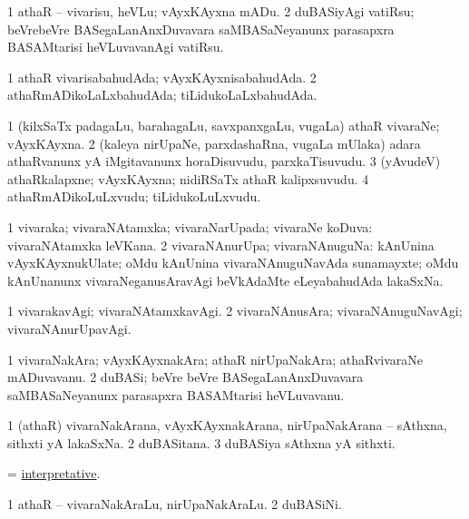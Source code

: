 \noindent 
\gl{\akirx}
\bmng
\bnum
\num{1} athaR -- vivarisu, heVLu; vAyxKAyxna mADu. 
\num{2} duBASiyAgi vatiRsu; beVrebeVre BASegaLanAnxDuvavara saMBASaNeyanunx parasapxra BASAMtarisi heVLuvavanAgi vatiRsu. 
\enum
\emng
\eentry

\bentry
{}
\gl{\gu}
\bmng
\bnum
\num{1} athaR vivarisabahudAda; vAyxKAyxnisabahudAda. 
\num{2} athaRmADikoLaLxbahudAda; tiLidukoLaLxbahudAda. 
\enum
\emng
\eentry

\bentry
{}
\gl{\nA}
\bmng
\bnum
\num{1} (kilxSaTx padagaLu, barahagaLu, savxpanxgaLu, \mo vugaLa) athaR vivaraNe; vAyxKAyxna. 
\num{2} (kaleya nirUpaNe, parxdashaRna, \mo vugaLa mUlaka) adara athaRvanunx yA iMgitavanunx horaDisuvudu, parxkaTisuvudu. 
\num{3} (yAvudeV) athaRkalapxne; vAyxKAyxna; nidiRSaTx athaR kalipxsuvudu. 
\num{4} athaRmADikoLuLxvudu; tiLidukoLuLxvudu. 
\enum
\emng
\eentry

\bentry
{}
\gl{\gu}
\bmng
\bnum
\num{1} vivaraka; vivaraNAtamxka; vivaraNarUpada; vivaraNe koDuva:  vivaraNAtamxka leVKana. 
\num{2} vivaraNAnurUpa; vivaraNAnuguNa:  kAnUnina vAyxKAyxnukUlate; oMdu kAnUnina vivaraNAnuguNavAda sunamayxte; oMdu kAnUnanunx vivaraNeganusAravAgi beVkAdaMte eLeyabahudAda lakaSxNa. 
\enum
\emng
\eentry

\bentry
{}
\gl{\kirxvi}
\bmng
\bnum
\num{1} vivarakavAgi; vivaraNAtamxkavAgi. 
\num{2} vivaraNAnusAra; vivaraNAnuguNavAgi; vivaraNAnurUpavAgi. 
\enum
\emng
\eentry

\bentry
{}
\gl{\nA}
\bmng
\bnum
\num{1} vivaraNakAra; vAyxKAyxnakAra; athaR nirUpaNakAra; athaRvivaraNe mADuvavanu. 
\num{2} duBASi; beVre beVre BASegaLanAnxDuvavara saMBASaNeyanunx parasapxra BASAMtarisi heVLuvavanu. 
\enum
\emng
\eentry

\bentry
{}
\gl{\nA}
\bmng
\bnum
\num{1} (athaR) vivaraNakArana, vAyxKAyxnakArana, nirUpaNakArana -- sAthxna, sithxti yA lakaSxNa. 
\num{2} duBASitana. 
\num{3} duBASiya sAthxna yA sithxti. 
\enum
\emng
\eentry

\bentry
{}
\gl{\gu}
\bmng
= \hyperlink{interpretative}{interpretative}. 
\emng
\eentry

\bentry
{}
\gl{\nA}
\bmng
\bnum
\num{1} athaR -- vivaraNakAraLu, nirUpaNakAraLu. 
\num{2} duBASiNi. 
\enum
\emng
\eentry

